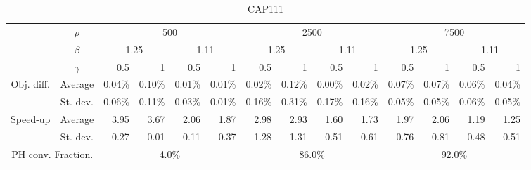 \documentclass[preprint, 1p, review]{elsarticle}
\begin{document}
%
 \begin{table}[htbp]
   \centering
   \tiny 
     \begin{tabular}{ccrrrrrrrrrrrr}
     \toprule
     \multirow{3}[6]{*}{} & $\rho$ & \multicolumn{4}{c}{500} & \multicolumn{4}{c}{2500} & \multicolumn{4}{c}{7500} \\
     
        & $\beta$ & \multicolumn{2}{c}{1.25} & \multicolumn{2}{c}{1.11} & \multicolumn{2}{c}{1.25} & \multicolumn{2}{c}{1.11} & \multicolumn{2}{c}{1.25} & \multicolumn{2}{c}{1.11} \\
        & $\gamma$ & 0.5 & 1  & 0.5 & 1  & 0.5 & 1  & 0.5 & 1  & 0.5 & 1  & 0.5 & 1 \\ \midrule
     \multirow{2}[4]{*}{Obj. diff.} & Average & 0.04\% & 0.10\% & 0.01\% & 0.01\% & 0.02\% & 0.12\% & 0.00\% & 0.02\% & 0.07\% & 0.07\% & 0.06\% & 0.04\% \\
        & St. dev. & 0.06\% & 0.11\% & 0.03\% & 0.01\% & 0.16\% & 0.31\% & 0.17\% & 0.16\% & 0.05\% & 0.05\% & 0.06\% & 0.05\% \\
     \multirow{2}[4]{*}{Speed-up} & Average & 3.95 & 3.67 & 2.06 & 1.87 & 2.98 & 2.93 & 1.60 & 1.73 & 1.97 & 2.06 & 1.19 & 1.25 \\
        & St. dev. & 0.27 & 0.01 & 0.11 & 0.37 & 1.28 & 1.31 & 0.51 & 0.61 & 0.76 & 0.81 & 0.48 & 0.51 \\ \midrule
     \multicolumn{2}{c}{PH conv. Fraction.} & \multicolumn{4}{c}{4.0\%} & \multicolumn{4}{c}{86.0\%} & \multicolumn{4}{c}{92.0\%} \\
     \bottomrule
     \end{tabular}%
   \label{tab:App2}%
   \caption{CAP111}      
\end{table}%
%
\end{document}
